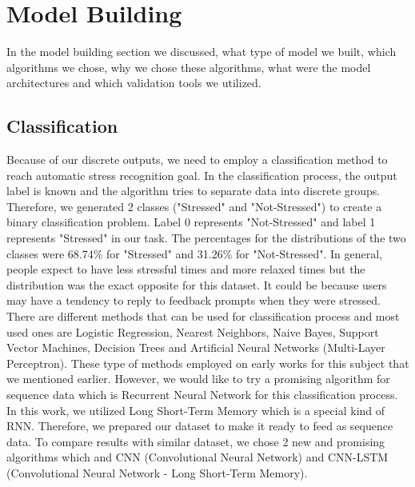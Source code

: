 \documentclass[12pt,oneandhalf,chaparabic,lfm,phd,eng,oneside,pntc]{gsufbe}
\begin{document}
\section{Model Building}
\label{sec:Model Building}
In the model building section we discussed, what type of model we built, which algorithms we chose, why we chose these algorithms, what were the model architectures and which validation tools we utilized.


\subsection{Classification}
\label{subsec:Classification}
Because of our discrete outputs, we need to employ a classification method to reach automatic stress recognition goal. In the classification process, the output label is known and the algorithm tries to separate data into discrete groups. Therefore, we generated 2 classes ("Stressed" and "Not-Stressed") to create a binary classification problem. Label 0 represents "Not-Stressed" and label 1 represents "Stressed" in our task. The percentages for the distributions of the two classes were 68.74\% for "Stressed" and 31.26\% for "Not-Stressed". In general, people expect to have less stressful times and more relaxed times but the distribution was the exact opposite for this dataset. It could be because users may have a tendency to reply to feedback prompts when they were stressed. There are different methods that can be used for classification process and most used ones are Logistic Regression, Nearest Neighbors, Naive Bayes, Support Vector Machines, Decision Trees and Artificial Neural Networks (Multi-Layer Perceptron). These type of methods employed on early works for this subject that we mentioned earlier. However, we would like to try a promising algorithm for sequence data which is Recurrent Neural Network for this classification process. In this work, we utilized Long Short-Term Memory which is a special kind of RNN. Therefore, we prepared our dataset to make it ready to feed as sequence data. To compare results with similar dataset, we chose 2 new and promising algorithms which and CNN (Convolutional Neural Network) and CNN-LSTM (Convolutional Neural Network - Long Short-Term Memory).
\end{document}
